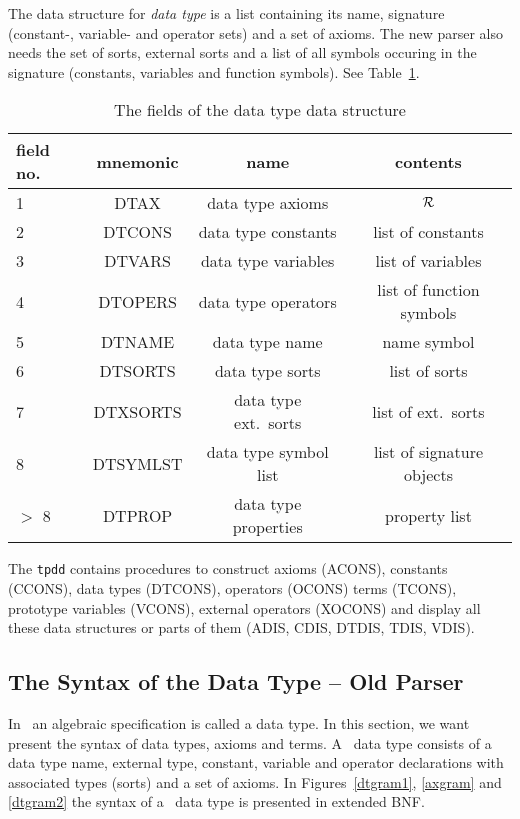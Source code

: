 The data structure for {\em data type} is a list containing its name,
signature (constant-, variable- and operator sets) and a set of axioms.
The new parser also needs the set of sorts, external sorts and a
list of all symbols occuring in the signature (constants, variables and
function symbols).
See Table~\ref{tb:dt}.
\begin{table}
\begin{center}
\begin{tabular}{|l|c|c|c|}
 \hline
 field no. & mnemonic & name & contents \\
 \hline\hline
 1 &  DTAX & data type axioms & $\cal R$ \\
 \hline
 2 & DTCONS & data type constants & list of constants  \\
 \hline
 3 & DTVARS & data type variables & list of variables \\
 \hline
 4 & DTOPERS & data type operators & list of function symbols  \\
 \hline
 5 & DTNAME & data type name & name symbol \\
 \hline
 6 & DTSORTS & data type sorts & list of sorts \\ \hline
 7 & DTXSORTS & data type ext.\ sorts & list of ext.\ sorts \\ \hline
 8 & DTSYMLST & data type symbol list & list of signature objects \\ \hline
  $>$ 8 & DTPROP & data type properties & property list \\
 \hline
\end{tabular}
\caption{The fields of the data type data structure} \label{tb:dt}
\end{center}
\end{table}

The {\tt tpdd} contains procedures to construct 
axioms (ACONS), constants (CCONS), data types (DTCONS), operators (OCONS)
terms (TCONS), prototype variables (VCONS), external operators (XOCONS) and 
display all these data structures or parts of them
(ADIS, CDIS, DTDIS, TDIS, VDIS).

\subsection{The Syntax of the Data Type -- Old Parser}
In \redux\ an algebraic specification is called a data type.
In this section, we want present the syntax of data types, axioms and terms.
A \redux\ data type consists of a data type name, external type,
constant, variable and operator declarations with associated types (sorts)
and a set of axioms.
In Figures~\ref{dtgram1}, \ref{axgram} and \ref{dtgram2}
the syntax of a  \redux\ data type is presented in
extended BNF.


